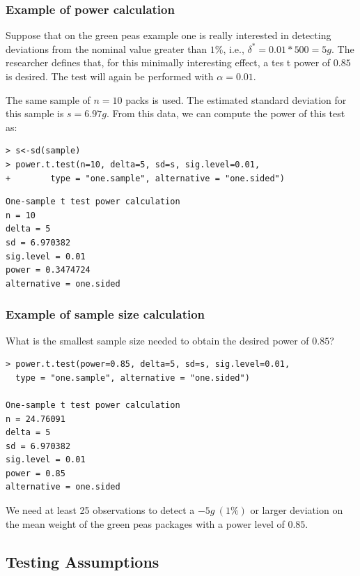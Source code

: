 \documentclass[10pt]{beamer}
\begin{document}
\begin{frame}
  \frametitle{Example of power calculation}

{\small Suppose that on the green peas example one is really interested in
detecting deviations from the nominal value greater than $1\%$, i.e.,
$\delta^* = 0.01*500 = 5g$. The researcher defines that, for this
minimally interesting effect, a tes t power of $0.85$ is desired. The
test will again be performed with $\alpha = 0.01$.

\smallskip

The same sample of $n=10$ packs is used. The estimated standard
deviation for this sample is $s=6.97g$. From this data, we can compute
the power of this test as:}
{\small
\begin{verbatim}
> s<-sd(sample)
> power.t.test(n=10, delta=5, sd=s, sig.level=0.01, 
+        type = "one.sample", alternative = "one.sided")
\end{verbatim}

\begin{verbatim}
One-sample t test power calculation 
n = 10
delta = 5
sd = 6.970382
sig.level = 0.01
power = 0.3474724
alternative = one.sided
\end{verbatim}}
\end{frame}

\begin{frame}
  \frametitle{Example of sample size calculation}
  What is the smallest sample size needed to obtain the desired power of $0.85$?

  \medskip
\begin{verbatim}
> power.t.test(power=0.85, delta=5, sd=s, sig.level=0.01,
  type = "one.sample", alternative = "one.sided")

One-sample t test power calculation 
n = 24.76091
delta = 5
sd = 6.970382
sig.level = 0.01
power = 0.85
alternative = one.sided
\end{verbatim}

\bigskip

We need at least 25 observations to detect a $-5g\ (1\%)$ or larger
deviation on the mean weight of the green peas packages with a power
level of $0.85$.
\end{frame}

\subsection{Testing Assumptions} %
\end{document}
